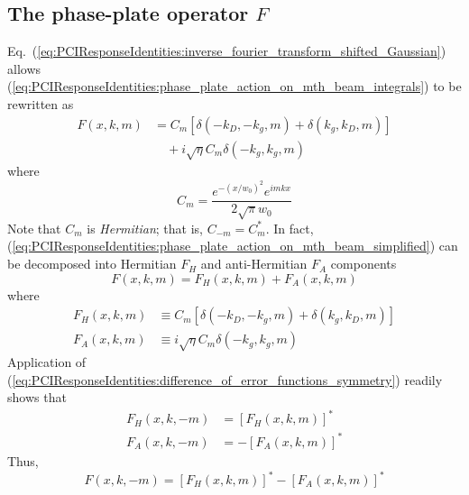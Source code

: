 \subsection{The phase-plate operator $F$}
Eq.~(\ref{eq:PCIResponseIdentities:inverse_fourier_transform_shifted_Gaussian})
allows (\ref{eq:PCIResponseIdentities:phase_plate_action_on_mth_beam_integrals})
to be rewritten as
\begin{equation}
  \begin{aligned}
    F(x, k, m)
    &=
    C_m
    [%
      \delta(-k_D, -k_g, m)
      +
      \delta(k_g, k_D, m)
    ]
    \\
    &\quad+
    i \sqrt{\eta} C_m \delta(-k_g, k_g, m)
  \end{aligned}
  \label{eq:PCIResponseIdentities:phase_plate_action_on_mth_beam_simplified}
\end{equation}
where
\begin{equation}
  C_m
  =
  \frac{e^{-(x / w_0)^2} e^{i m k x}}{2 \sqrt{\pi} w_0}
\end{equation}
Note that $C_m$ is \emph{Hermitian};
that is, $C_{-m} = C_m^*$.
In fact,
(\ref{eq:PCIResponseIdentities:phase_plate_action_on_mth_beam_simplified})
can be decomposed into Hermitian $F_H$ and anti-Hermitian $F_A$ components
\begin{equation}
  F(x, k, m)
  =
  F_H(x, k, m)
  +
  F_A(x, k, m)
  \label{eq:PCIResponseIdentities:phase_plate_action_on_mth_beam_Hermitian_decomposed}
\end{equation}
where
\begin{align}
  F_H(x, k, m)
  &\equiv
  C_m
  [%
    \delta(-k_D, -k_g, m)
    +
    \delta(k_g, k_D, m)
  ]
  \label{eq:PCIResponseIdentities:phase_plate_action_on_mth_beam_Hermitian}
  \\
  F_A(x, k, m)
  &\equiv
  i \sqrt{\eta} C_m \delta(-k_g, k_g, m)
  \label{eq:PCIResponseIdentities:phase_plate_action_on_mth_beam_antiHermitian}
\end{align}
Application of
(\ref{eq:PCIResponseIdentities:difference_of_error_functions_symmetry})
readily shows that
\begin{align}
  F_H(x, k, -m) &= [F_H(x, k, m)]^*
  \\
  F_A(x, k, -m) &= -[F_A(x, k, m)]^*
\end{align}
Thus,
\begin{equation}
  F(x, k, -m)
  =
  [F_H(x, k, m)]^*
  -
  [F_A(x, k, m)]^*
  \label{eq:PCIResponseIdentities:phase_plate_action_on_mth_beam_symmetry}
\end{equation}


